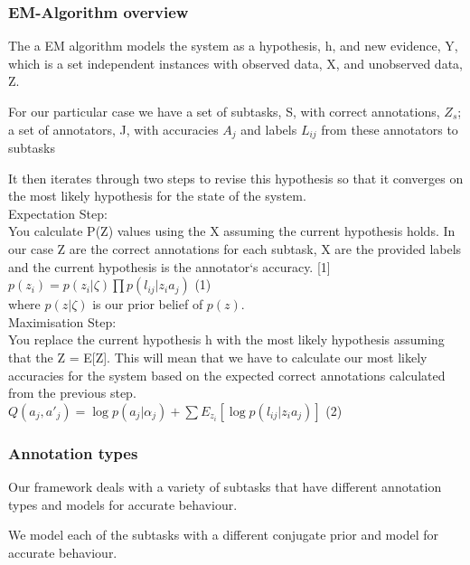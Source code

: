 \documentclass[11pt]{article}
\begin{document}
\subsubsection{EM-Algorithm overview}

The a EM algorithm models the system as a hypothesis, h, and new evidence, Y, which is a set independent instances with observed data, X, and unobserved data, Z.

For our particular case we have a set of subtasks, S, with correct annotations, $Z_{s}$; a set of annotators, J, with accuracies $A_{j}$ and labels $L_{ij}$ from these annotators to subtasks

It then iterates through two steps to revise this hypothesis so that it converges on the most likely hypothesis for the state of the system.\\

Expectation Step:\\
You calculate P(Z) values using the X assuming the current hypothesis holds. In our case Z are the correct annotations for each subtask, X are the provided labels and the current hypothesis is the annotator`s accuracy. [1]\\

$ p(z_{i}) = p(z_{i}|\zeta) \prod p (l_{ij} | z_{i} a_{j}) $ (1)\\

where $p(z|\zeta)$ is our prior belief of $p(z)$.\\

Maximisation Step:\\
You replace the current hypothesis h with the most likely hypothesis assuming that the Z = E[Z]. This will mean that we have to calculate our most likely accuracies for the system based on the expected correct annotations calculated from the previous step.\\

$ Q(a_{j},a\prime_{j}) = \log p(a_{j}|\alpha_{j}) + \sum E_{z_{i}} [\log p (l_{ij} | z_{i} a_{j})]$ (2)\\

\subsubsection{Annotation types}

Our framework deals with a variety of subtasks that have different annotation types and models for accurate behaviour.

We model each of the subtasks with a different conjugate prior and model for accurate behaviour.\\
\end{document}
